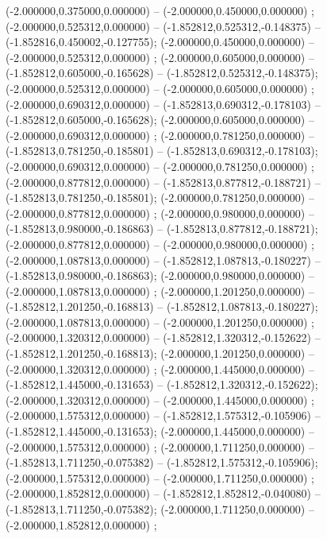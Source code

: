 (-2.000000,0.375000,0.000000) -- (-2.000000,0.450000,0.000000) ;
 (-2.000000,0.525312,0.000000) -- (-1.852812,0.525312,-0.148375) -- (-1.852816,0.450002,-0.127755);
 (-2.000000,0.450000,0.000000) -- (-2.000000,0.525312,0.000000) ;
 (-2.000000,0.605000,0.000000) -- (-1.852812,0.605000,-0.165628) -- (-1.852812,0.525312,-0.148375);
 (-2.000000,0.525312,0.000000) -- (-2.000000,0.605000,0.000000) ;
 (-2.000000,0.690312,0.000000) -- (-1.852813,0.690312,-0.178103) -- (-1.852812,0.605000,-0.165628);
 (-2.000000,0.605000,0.000000) -- (-2.000000,0.690312,0.000000) ;
 (-2.000000,0.781250,0.000000) -- (-1.852813,0.781250,-0.185801) -- (-1.852813,0.690312,-0.178103);
 (-2.000000,0.690312,0.000000) -- (-2.000000,0.781250,0.000000) ;
 (-2.000000,0.877812,0.000000) -- (-1.852813,0.877812,-0.188721) -- (-1.852813,0.781250,-0.185801);
 (-2.000000,0.781250,0.000000) -- (-2.000000,0.877812,0.000000) ;
 (-2.000000,0.980000,0.000000) -- (-1.852813,0.980000,-0.186863) -- (-1.852813,0.877812,-0.188721);
 (-2.000000,0.877812,0.000000) -- (-2.000000,0.980000,0.000000) ;
 (-2.000000,1.087813,0.000000) -- (-1.852812,1.087813,-0.180227) -- (-1.852813,0.980000,-0.186863);
 (-2.000000,0.980000,0.000000) -- (-2.000000,1.087813,0.000000) ;
 (-2.000000,1.201250,0.000000) -- (-1.852812,1.201250,-0.168813) -- (-1.852812,1.087813,-0.180227);
 (-2.000000,1.087813,0.000000) -- (-2.000000,1.201250,0.000000) ;
 (-2.000000,1.320312,0.000000) -- (-1.852812,1.320312,-0.152622) -- (-1.852812,1.201250,-0.168813);
 (-2.000000,1.201250,0.000000) -- (-2.000000,1.320312,0.000000) ;
 (-2.000000,1.445000,0.000000) -- (-1.852812,1.445000,-0.131653) -- (-1.852812,1.320312,-0.152622);
 (-2.000000,1.320312,0.000000) -- (-2.000000,1.445000,0.000000) ;
 (-2.000000,1.575312,0.000000) -- (-1.852812,1.575312,-0.105906) -- (-1.852812,1.445000,-0.131653);
 (-2.000000,1.445000,0.000000) -- (-2.000000,1.575312,0.000000) ;
 (-2.000000,1.711250,0.000000) -- (-1.852813,1.711250,-0.075382) -- (-1.852812,1.575312,-0.105906);
 (-2.000000,1.575312,0.000000) -- (-2.000000,1.711250,0.000000) ;
 (-2.000000,1.852812,0.000000) -- (-1.852812,1.852812,-0.040080) -- (-1.852813,1.711250,-0.075382);
 (-2.000000,1.711250,0.000000) -- (-2.000000,1.852812,0.000000) ;
